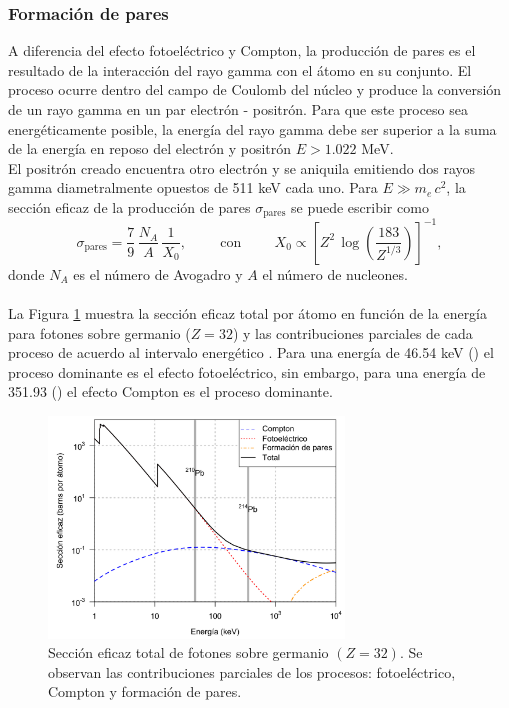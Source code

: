 		\subsubsection{Formación de pares}
A diferencia del efecto fotoeléctrico y Compton, la producción de pares es el resultado de la interacción del rayo gamma con el átomo en su conjunto. El proceso ocurre dentro del campo de Coulomb del núcleo y produce la conversión de un rayo gamma en un par electrón - positrón. Para que este proceso sea energéticamente posible, la energía del rayo gamma debe ser superior a la suma de la energía en reposo del electrón y positrón $E > 1.022$ MeV.
\vspace{0.5cm} \\
El positrón creado encuentra otro electrón y se aniquila emitiendo dos rayos gamma diametralmente opuestos de 511 keV cada uno. Para $E \gg m_e\,c^2$, la sección eficaz de la producción de pares $\sigma_{\text{pares}}$ se puede escribir como \cite{grupen2008particle}
\begin{equation}
\sigma_{\text{pares}} = \dfrac{7}{9}\,\dfrac{N_A}{A}\,\dfrac{1}{X_0}, \hspace{1cm}\text{con}\hspace{1cm} X_0 \propto\left[Z^2\,\log\left(\dfrac{183}{Z^{1/3}}\right) \right]^{-1}, 
\end{equation}
donde $N_A$ es el número de Avogadro y $A$ el número de nucleones.
\\ \\ 
La Figura \ref{Fig-Secciones} muestra la sección eficaz total por átomo en función de la energía para fotones sobre germanio ($Z=32$) y las contribuciones parciales de cada proceso de acuerdo al intervalo energético \cite{NistGE}. Para una energía de 46.54 keV (\PbCero) el proceso dominante es el efecto fotoeléctrico, sin embargo, para una energía de 351.93 (\PbCuatro) el efecto Compton es el proceso dominante. 
\begin{figure}[h]
\centering
\includegraphics[width=0.7\textwidth]{Imagenes/CrossSectionGe.png}
\caption{Sección eficaz total de fotones sobre germanio $(Z=32)$. Se observan las contribuciones parciales de los procesos: fotoeléctrico, Compton y formación de pares.}\label{Fig-Secciones}
\end{figure}

